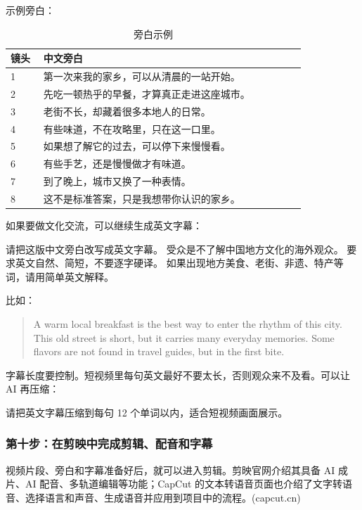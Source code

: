 示例旁白：

\begin{table}[H]
\centering
\caption{旁白示例}
\label{tab:video-narration-example}
\begin{tabular}{p{0.10\linewidth} p{0.80\linewidth}}
\toprule
\textbf{镜头} & \textbf{中文旁白} \\
\midrule
1 & 第一次来我的家乡，可以从清晨的一站开始。 \\
2 & 先吃一顿热乎的早餐，才算真正走进这座城市。 \\
3 & 老街不长，却藏着很多本地人的日常。 \\
4 & 有些味道，不在攻略里，只在这一口里。 \\
5 & 如果想了解它的过去，可以停下来慢慢看。 \\
6 & 有些手艺，还是慢慢做才有味道。 \\
7 & 到了晚上，城市又换了一种表情。 \\
8 & 这不是标准答案，只是我想带你认识的家乡。 \\
\bottomrule
\end{tabular}
\end{table}

如果要做文化交流，可以继续生成英文字幕：

\begin{tcolorbox}[promptbox]
请把这版中文旁白改写成英文字幕。
受众是不了解中国地方文化的海外观众。
要求英文自然、简短，不要逐字硬译。
如果出现地方美食、老街、非遗、特产等词，请用简单英文解释。
\end{tcolorbox}

比如：
\begin{quote}
A warm local breakfast is the best way to enter the rhythm of this city.
This old street is short, but it carries many everyday memories.
Some flavors are not found in travel guides, but in the first bite.
\end{quote}

字幕长度要控制。短视频里每句英文最好不要太长，否则观众来不及看。可以让 AI 再压缩：

\begin{tcolorbox}[promptbox]
请把英文字幕压缩到每句 12 个单词以内，适合短视频画面展示。
\end{tcolorbox}

\subsubsection*{第十步：在剪映中完成剪辑、配音和字幕}

视频片段、旁白和字幕准备好后，就可以进入剪辑。剪映官网介绍其具备 AI 成片、AI 配音、多轨道编辑等功能；CapCut 的文本转语音页面也介绍了文字转语音、选择语言和声音、生成语音并应用到项目中的流程。(capcut.cn)

